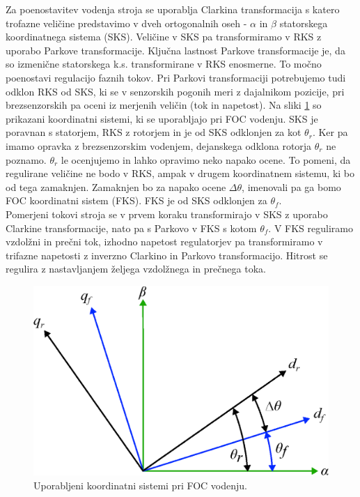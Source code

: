 \documentclass[a4paper,twoside,openright,12pt,slovene]{book}
\begin{document}
Za poenostavitev vodenja stroja se uporablja Clarkina transformacija s katero trofazne veličine predstavimo v dveh ortogonalnih oseh - $\alpha$ in $\beta$ statorskega koordinatnega sistema (SKS).
Veličine v SKS pa transformiramo v RKS z uporabo Parkove transformacije. Ključna lastnost Parkove transformacije je, da so izmenične statorskega k.s. transformirane v RKS enosmerne. To močno
poenostavi regulacijo faznih tokov. Pri Parkovi transformaciji potrebujemo tudi odklon RKS od SKS, ki se v senzorskih pogonih meri z dajalnikom pozicije, pri brezsenzorskih pa oceni iz merjenih
veličin (tok in napetost). Na sliki \ref{koordinatniSistemSimple} so prikazani koordinatni sistemi, ki se uporabljajo pri FOC vodenju. SKS je poravnan s statorjem, RKS z rotorjem in je od SKS
odklonjen za kot $\theta_r$. Ker pa imamo opravka z brezsenzorskim vodenjem, dejanskega odklona rotorja $\theta_r$ ne poznamo. $\theta_r$ le ocenjujemo in lahko opravimo neko napako ocene. To pomeni,
da regulirane veličine ne bodo v RKS, ampak v drugem koordinatnem sistemu, ki bo od tega zamaknjen. Zamaknjen bo za napako ocene $\Delta\theta$, imenovali pa ga bomo FOC koordinatni sistem (FKS). FKS
je od SKS odklonjen za $\theta_f$. \\
Pomerjeni tokovi stroja se v prvem koraku transformirajo v SKS z uporabo Clarkine transformacije, nato pa s Parkovo v FKS s kotom $\theta_f$. V FKS reguliramo vzdolžni in prečni tok, izhodno napetost
regulatorjev pa transformiramo v trifazne napetosti z inverzno Clarkino in Parkovo transformacijo. Hitrost se regulira z nastavljanjem željega vzdolžnega in prečnega toka.

\begin{figure}[!htbp]
    \centering
    \includegraphics[width=0.7\columnwidth]{Slike/Inkscape/koordinatniSistemSimple.eps}
    \caption{\label{koordinatniSistemSimple} Uporabljeni koordinatni sistemi pri FOC vodenju.}
\end{figure}
\end{document}
